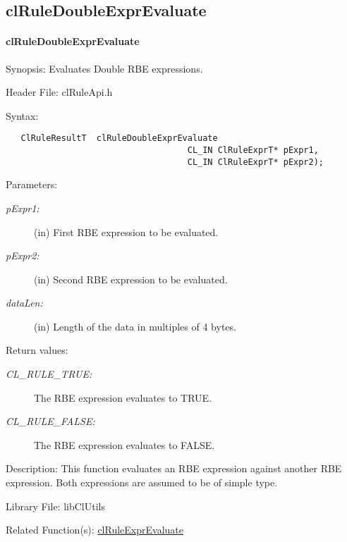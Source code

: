 \begin{flushleft}
\subsection{clRuleDoubleExprEvaluate}
\hypertarget{pagerule106}{}\paragraph{cl\-Rule\-Double\-Expr\-Evaluate}\label{pagerule106}
\begin{Desc}
\item[Synopsis:]Evaluates Double RBE expressions.\end{Desc}
\begin{Desc}
\item[Header File:]clRuleApi.h\end{Desc}
\begin{Desc}
\item[Syntax:]

\footnotesize\begin{verbatim}   ClRuleResultT  clRuleDoubleExprEvaluate
                              		CL_IN ClRuleExprT* pExpr1,
                              		CL_IN ClRuleExprT* pExpr2);
\end{verbatim}
\normalsize
\end{Desc}
\begin{Desc}
\item[Parameters:]
\begin{description}
\item[{\em p\-Expr1:}](in) First RBE expression to be evaluated. \item[{\em p\-Expr2:}](in) Second RBE expression to be evaluated. 
\item[{\em data\-Len:}](in) Length of the data in multiples of 4 bytes.\end{description}
\end{Desc}
\begin{Desc}
\item[Return values:]
\begin{description}
\item[{\em CL\_\-RULE\_\-TRUE:}]The RBE expression evaluates to TRUE. 
\item[{\em CL\_\-RULE\_\-FALSE:}]The RBE expression evaluates to FALSE.\end{description}
\end{Desc}
\begin{Desc}
\item[Description:]This function evaluates an RBE expression against another RBE expression. Both expressions are assumed to be of simple type.\end{Desc}
\begin{Desc}
\item[Library File:]lib\-Cl\-Utils\end{Desc}
\begin{Desc}
\item[Related Function(s):]\hyperlink{pagerule105}{cl\-Rule\-Expr\-Evaluate} \end{Desc}
\newpage



\end{flushleft}
